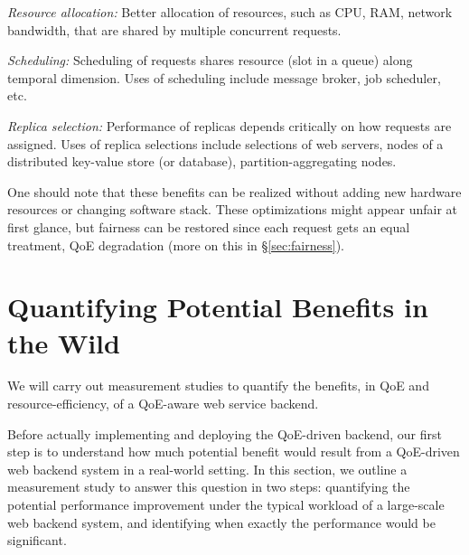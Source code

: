 \begin{packeditemize}

\item {\em Resource allocation:} 
Better allocation of resources, such as CPU, RAM, network bandwidth, that are shared by multiple concurrent requests. 

\item {\em Scheduling:}
Scheduling of requests shares resource (\eg slot in a queue) along temporal dimension.
Uses of scheduling include message broker, job scheduler, etc.

\item {\em Replica selection:}
Performance of replicas depends critically on how requests are assigned.
Uses of replica selections include selections of web servers, nodes of a distributed key-value store (or database), partition-aggregating nodes.

\end{packeditemize}
One should note that these benefits can be realized without adding new hardware resources or changing software stack.
These optimizations might appear unfair at first glance, but fairness can be restored since each request gets an equal treatment, \ie QoE degradation (more on this in \S\ref{sec:fairness}).







\section{Quantifying Potential Benefits in the Wild}
\label{sec:quantifying}
\begin{task}
We will carry out measurement studies to quantify the benefits, in QoE and resource-efficiency, of a QoE-aware web service backend.
\end{task}

Before actually implementing and deploying the QoE-driven backend, our first step is to understand how much potential benefit would result from a QoE-driven web backend system in a real-world setting. 
In this section, we outline a measurement study to answer this question in two steps: quantifying the potential performance improvement under the typical workload of a large-scale web backend system, and identifying when exactly the performance would be significant.


